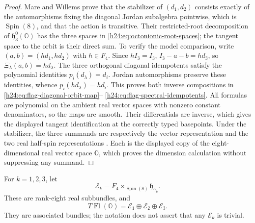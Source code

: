 \begin{proof}
Mare and Willems prove that the stabilizer of \((d_1,d_2)\) consists
exactly of the automorphisms fixing the diagonal Jordan subalgebra
pointwise, which is \(\operatorname{Spin}(8)\), and that the action is
transitive.  Their restricted-root decomposition of
\(\mathfrak h_3^0(\mathbb O)\) has the three spaces in
\eqref{h24:eq:octonionic-root-spaces}; the tangent space to the orbit is their
direct sum.  To verify the model comparison, write
\((a,b)=(h d_1,h d_2)\) with \(h\in F_4\).  Since \(hI_3=I_3\),
\(I_3-a-b=hd_3\), so \(\Xi_\lambda(a,b)=hd_\lambda\).
The three orthogonal diagonal idempotents satisfy the polynomial
identities \(p_i(d_\lambda)=d_i\).  Jordan automorphisms preserve these
identities, whence \(p_i(hd_\lambda)=hd_i\).  This proves both inverse
compositions in \eqref{h24:eq:flag-diagonal-orbit-map}--
\eqref{h24:eq:flag-spectral-idempotents}.  All formulas are polynomial on
the ambient real vector spaces with nonzero constant denominators, so the
maps are smooth.  Their differentials are inverse, which gives the
displayed tangent identification at the correctly typed basepoints.
Under the stabilizer, the three summands are respectively
the vector representation and the two real half-spin representations
\cite[pp.~491--492, especially the discussion around
Equation~(2.10)]{h24:MareWillems2013}.  Each is the displayed copy of the
eight-dimensional real vector space \(\mathbb O\), which proves the dimension
calculation without suppressing any summand.
\end{proof}

For \(k=1,2,3\), let
\[
 \mathcal E_k=F_4\times_{\operatorname{Spin}(8)}
                         \mathfrak h_{\gamma_k}.
\]
These are rank-eight real subbundles, and
\begin{equation}
 T\operatorname{Fl}(\mathbb O)=
 \mathcal E_1\oplus\mathcal E_2\oplus\mathcal E_3.
 \label{h24:eq:octonionic-tangent-bundles}
\end{equation}
They are associated bundles; the notation does not assert that any
\(\mathcal E_k\) is trivial.


